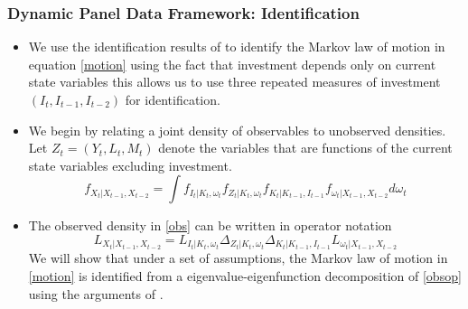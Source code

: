 \documentclass{beamer}
\begin{document}
\begin{frame}
\frametitle{Dynamic Panel Data Framework: Identification}
\begin{itemize}
	\item We use the identification results of \cite{Hu2012} to identify the Markov law of motion in equation \eqref{motion} using the fact that investment depends only on current state variables this allows us to use three repeated measures of investment $(I_{t}, I_{t-1}, I_{t-2})$ for identification. 
	\item We begin by relating a joint density of observables to unobserved densities. Let $Z_{t}=(Y_{t}, L_{t}, M_{t})$ denote the variables that are functions of the current state variables excluding investment.
		\begin{equation} \label{obs}
		f_{X_{t}|X_{t-1}, X_{t-2}}=\int f_{I_{t}|K_{t}, \omega_{t}}f_{Z_{t}|K_{t}, \omega_{t}}f_{K_{t}|K_{t-1}, I_{t-1}}f_{\omega_{t}|X_{t-1}, X_{t-2}}d\omega_{t}
		\end{equation}
	\item The observed density in \eqref{obs} can be written in operator notation
		\begin{equation} \label{obsop}
		L_{X_{t}|X_{t-1}, X_{t-2}}=L_{I_{t}|K_{t}, \omega_{t}}\Delta_{Z_{t}|K_{t}, \omega_{t}}\Delta_{K_{t}|K_{t-1}, I_{t-1}}L_{\omega_{t}|X_{t-1}, X_{t-2}}
		\end{equation}
		We will show that under a set of assumptions, the Markov law of motion in \eqref{motion} is identified from a eigenvalue-eigenfunction decomposition of \eqref{obsop} using the arguments of \cite{Hu2008}.
	\end{itemize}
\end{frame}

\end{document}
